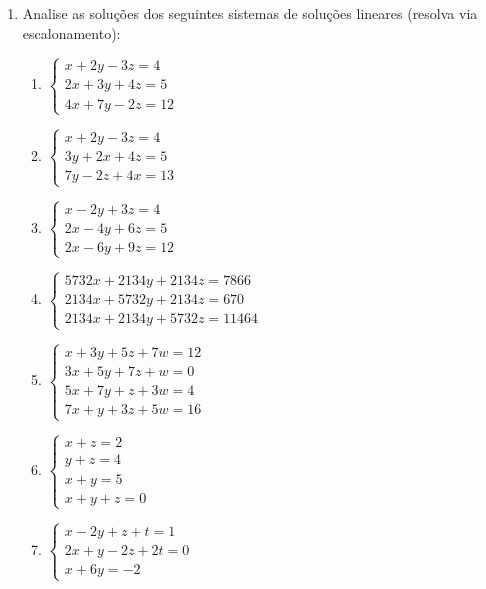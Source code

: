 \documentclass[oneside,a4paper,12pt]{article}
\begin{document}
\begin{enumerate}
	\item Analise as soluções dos seguintes sistemas de soluções lineares (resolva via escalonamento):
	\begin{multicols}{2}
	\begin{enumerate}
		\item $\begin{cases}
		x + 2y - 3z = 4 \\
		2x + 3y + 4z = 5 \\
		4x + 7y - 2z = 12
		\end{cases}$
		\item $\begin{cases}
		x + 2y - 3z = 4 \\
		3y + 2x + 4z = 5 \\
		7y - 2z + 4x = 13
		\end{cases}$
		\item $\begin{cases}
		x - 2y + 3z = 4 \\
		2x - 4y + 6z = 5 \\
		2x - 6y + 9z = 12
		\end{cases}$
		\item $\begin{cases}
		5732x + 2134y + 2134z = 7866 \\
		2134x + 5732y + 2134z = 670 \\
		2134x + 2134y + 5732z = 11464 
		\end{cases}$
		\item $\begin{cases}
		x + 3y + 5z + 7w = 12 \\
		3x + 5y + 7z + w = 0 \\
		5x + 7y + z + 3w = 4 \\
		7x + y + 3z + 5w = 16
		\end{cases}$
		\item $\begin{cases}
		x + z = 2 \\
		y + z = 4 \\
		x + y = 5 \\
		x + y + z = 0
		\end{cases}$
		\item $\begin{cases}
		x - 2y + z + t = 1 \\
		2x + y - 2z + 2t = 0 \\
		x + 6y = -2
		\end{cases}$
	\end{enumerate}
	\end{multicols}		
	

\end{enumerate}
\end{document}
